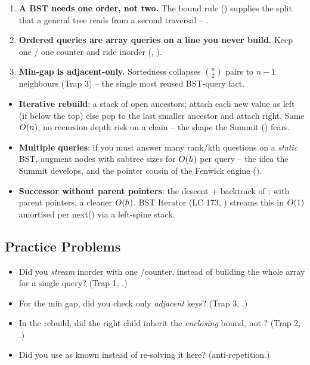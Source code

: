\begin{insightbox}
\begin{enumerate}[nosep, leftmargin=1.6em]
  \item \textbf{A BST needs one order, not two.} The bound rule () supplies the
        split that a general tree reads from a second traversal -- .
  \item \textbf{Ordered queries are array queries on a line you never build.} Keep one  /
        one counter and ride inorder (, ).
  \item \textbf{Min-gap is adjacent-only.} Sortedness collapses $\binom{n}{2}$ pairs to $n-1$
        neighbours (Trap 3) -- the single most reused BST-query fact.
\end{enumerate}
\end{insightbox}

\begin{hardeningbox}
\begin{itemize}[nosep, leftmargin=1.4em]
  \item \textbf{Iterative rebuild}: a stack of open ancestors; attach each new value as left (if
        below the top) else pop to the last smaller ancestor and attach right. Same $O(n)$, no
        recursion depth risk on a chain -- the shape the Summit () fears.
  \item \textbf{Multiple queries}: if you must answer many rank/kth questions on a \emph{static} BST,
        augment nodes with subtree sizes for $O(h)$ per query -- the idea the Summit develops,
        and the pointer cousin of the Fenwick engine ().
  \item \textbf{Successor without parent pointers}: the descent + backtrack of ;
        with parent pointers, a cleaner $O(h)$. BST Iterator (LC 173, ) streams this
        in $O(1)$ amortised per next() via a left-spine stack.
\end{itemize}
\end{hardeningbox}

\subsection{Practice Problems}

\begin{stuckbox}
\begin{itemize}[nosep, leftmargin=1.4em]
  \item Did you \emph{stream} inorder with one /counter, instead of building the whole
        array for a single query? (Trap 1, .)
  \item For the min gap, did you check only \emph{adjacent} keys? (Trap 3, .)
  \item In the rebuild, did the right child inherit the \emph{enclosing} bound, not ?
        (Trap 2, .)
  \item Did you use  as known instead of re-solving it here? (anti-repetition.)
\end{itemize}
\end{stuckbox}

